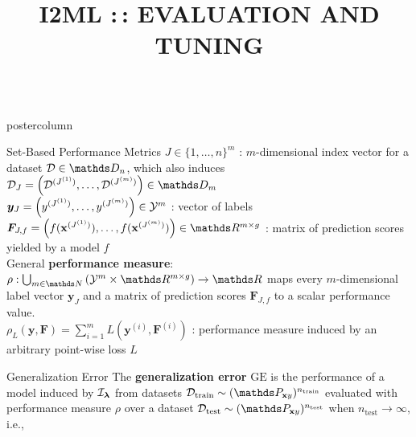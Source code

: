 \documentclass{beamer}
\title{I2ML :\,: EVALUATION AND TUNING} %
\begin{document}
\begin{frame}[fragile]{}
\vspace{-8ex}
\begin{columns}
	\begin{column}{.31\textwidth}
		\begin{beamercolorbox}[center]{postercolumn}
			\begin{minipage}{.98\textwidth}
				\parbox[t][\columnheight]{\textwidth}{
\begin{myblock}{Set-Based Performance Metrics}
$J \in \{1,\dots,n\}^m$ : $m$-dimensional index vector for a dataset $\D \in 
\allDatasetsn$, which also induces 
$\D_J = \left(\D^{(J^{(1)})},\dots,\D^{(J^{(m)})}\right) \in \allDatasets_m$\\


$\boldsymbol{y}_J = \left(y^{(J^{(1)})},\dots,y^{(J^{(m)})}\right) \in \mathcal{Y}^m$ :
vector of labels\\

$\boldsymbol{F}_{J,f} = \left(f(\xv^{(J^{(1)})}),\dots, f(\xv^{(J^{(m)})})\right) 
\in \R^{m\times g}$ : matrix of prediction scores yielded by a model $f$\\

General \textbf{performance measure}: $\rho: \bigcup_{m\in\N}\left(\Yspace^m\times\R^{m\times g}\right)  \rightarrow \R$ maps every $m$-dimensional label vector $\boldsymbol{y}_J$ and a matrix of prediction scores $\boldsymbol{F}_{J,f}$ to a scalar performance value.\\

$\rho_L (\boldsymbol{y}, \boldsymbol{F}) = \sum_{i=1}^m L(\boldsymbol{y}^{(i)}, \boldsymbol{F}^{(i)})$ : performance measure induced by an arbitrary point-wise loss $L$

\end{myblock}
\begin{myblock}{Generalization Error}
The \textbf{generalization error} $\mathrm{GE}$ is the performance of a model induced by $\mathcal{I}_{\boldsymbol{\lambda}}$ from datasets $\Dtrain \sim (\P_{\xv y})^{n_{\mathrm{train}}}$ evaluated with performance measure $\rho$ over a dataset $\Dtest \sim (\P_{\xv y})^{n_{\mathrm{test}}}$ when $n_{\mathrm{test}}\rightarrow\infty$, i.e.,\\


\end{myblock}}
\end{minipage}
\end{beamercolorbox}
\end{column}
\end{columns}
\end{frame}
\end{document}

